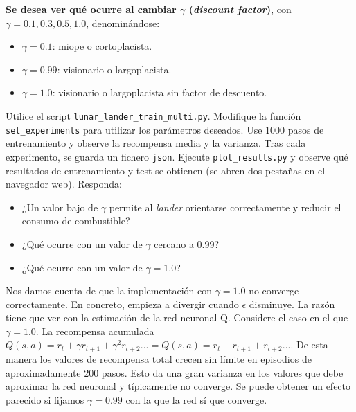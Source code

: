 \documentclass{article}
\begin{document}


\begin{exercise}
    \textbf{Se desea ver qué ocurre al cambiar $\gamma$ (\textit{discount factor})}, con $\gamma=0.1, 0.3, 0.5, 1.0$, denominándose:
    \begin{itemize}
        \item $\gamma = 0.1$: miope o cortoplacista.
        \item $\gamma = 0.99$: visionario o largoplacista.
        \item $\gamma = 1.0$: visionario o largoplacista sin factor de descuento.
    \end{itemize}
    Utilice el script \texttt{lunar\_lander\_train\_multi.py}. Modifique la función \texttt{set\_experiments} para utilizar los parámetros deseados. Use 1000 pasos de entrenamiento y observe la recompensa media y la varianza. Tras cada experimento, se guarda un fichero \texttt{json}. Ejecute \texttt{plot\_results.py} y observe qué resultados de entrenamiento y test se obtienen (se abren dos pestañas en el navegador web).  Responda:
    \begin{itemize}
        \item ¿Un valor bajo de $\gamma$ permite al \textit{lander} orientarse correctamente y reducir el consumo de combustible?
        \item ¿Qué ocurre con un valor de $\gamma$ cercano a 0.99?
        \item ¿Qué ocurre con un valor de $\gamma=1.0$?
    \end{itemize}
\end{exercise}
Nos damos cuenta de que la implementación con $\gamma=1.0$ no converge correctamente. En concreto, empieza a divergir cuando $\epsilon$ disminuye. La razón tiene que ver con la estimación de la red neuronal Q. Considere el caso en el que $\gamma = 1.0$. La recompensa acumulada $Q(s,a)=r_t+\gamma r_{t+1}+\gamma^2 r_{t+2} ...=Q(s,a)=r_t+ r_{t+1}+ r_{t+2} ...$. De esta manera los valores de recompensa total crecen sin límite en episodios de aproximadamente 200 pasos. Esto da una gran varianza en los valores que debe aproximar la red neuronal y típicamente no converge. Se puede obtener un efecto parecido si fijamos $\gamma=0.99$ con la que la red sí que converge.
\end{document}
